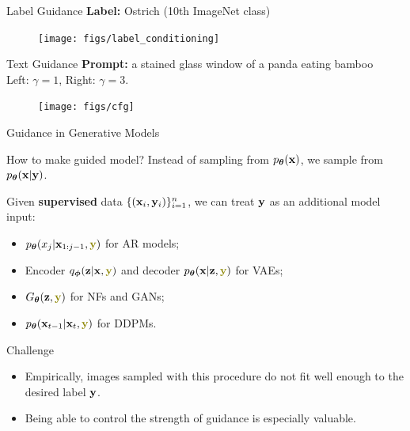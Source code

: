 \documentclass{beamer}
\begin{document}
\begin{frame}{Label Guidance}
	\textbf{Label:} Ostrich (10th ImageNet class) 
	\begin{figure}
		\texttt{[image: figs/label\_conditioning]}
	\end{figure}
\end{frame}
\begin{frame}{Text Guidance}
	\textbf{Prompt:} a stained glass window of a panda eating bamboo \\
	Left: $\gamma = 1$, Right: $\gamma = 3$.
	\begin{figure}
		\texttt{[image: figs/cfg]}
	\end{figure}
\end{frame}
\begin{frame}{Guidance in Generative Models}
	\begin{block}{How to make guided model?}
		Instead of sampling from $p_{\boldsymbol{\theta}}(\mathbf{x})$, we sample from $p_{\boldsymbol{\theta}}(\mathbf{x} | \mathbf{y})$.
	\end{block}
	\eqpause
	Given \textbf{supervised} data $\{(\mathbf{x}_i, \mathbf{y}_i)\}_{i=1}^n$, we can treat $\mathbf{y}$ as an additional model input:
	\eqpause
	\begin{itemize}
		\item $\pt(x_j | \bx_{1:j-1}, {\color{olive}\by})$ for AR models;
		\eqpause
		\item Encoder $q_{\bphi}(\bz | \bx, {\color{olive}\by})$ and decoder $\pt(\bx | \bz, {\color{olive}\by})$ for VAEs;
		\eqpause
		\item $G_{\btheta}(\bz, {\color{olive}\by})$ for NFs and GANs;
		\eqpause
		\item $\pt(\bx_{t-1} | \bx_t, {\color{olive}\by})$ for DDPMs.
	\end{itemize}
	\eqpause
	\begin{block}{Challenge}
		\begin{itemize}
			\item Empirically, images sampled with this procedure do not fit well enough to the desired label $\mathbf{y}$.
			\item Being able to control the strength of guidance is especially valuable.
		\end{itemize}
	\end{block}
\end{frame}
\end{document}
